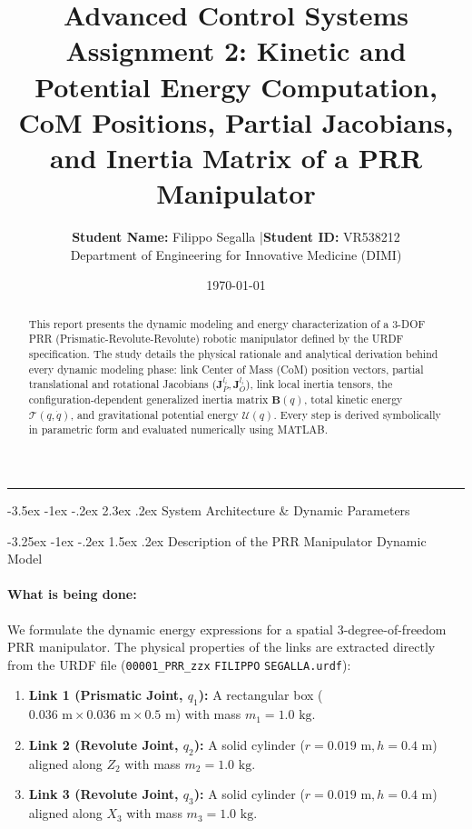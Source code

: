 \documentclass[11pt, a4paper]{article}
\title{
    \vspace{-1cm}
    \color{brandblue}\textbf{Advanced Control Systems}\\[0.3em]
    \Large\textbf{Assignment 2: Kinetic and Potential Energy Computation, CoM Positions, Partial Jacobians, and Inertia Matrix of a PRR Manipulator}
}
\author{\textbf{Student Name:} Filippo Segalla \quad|\quad \textbf{Student ID:} VR538212\\[0.2em]
\small Department of Engineering for Innovative Medicine (DIMI) }
\date{\today}
\makeatletter
\renewcommand{\section}{\@startsection{section}{1}{\z@}%
    {-3.5ex \@plus -1ex \@minus -.2ex}%
    {2.3ex \@plus .2ex}%
    {\normalfont\Large\bfseries\color{brandblue}}}
\renewcommand{\subsection}{\@startsection{subsection}{2}{\z@}%
    {-3.25ex \@plus -1ex \@minus -.2ex}%
    {1.5ex \@plus .2ex}%
    {\normalfont\large\bfseries\color{brandaccent}}}
\makeatother
\begin{document}
\maketitle
\thispagestyle{empty}

\begin{abstract}
\noindent This report presents the dynamic modeling and energy characterization of a 3-DOF PRR (Prismatic-Revolute-Revolute) robotic manipulator defined by the URDF specification. The study details the physical rationale and analytical derivation behind every dynamic modeling phase: link Center of Mass (CoM) position vectors, partial translational and rotational Jacobians ($\mathbf{J}_P^{l_i}, \mathbf{J}_O^{l_i}$), link local inertia tensors, the configuration-dependent generalized inertia matrix $\mathbf{B}(q)$, total kinetic energy $\mathcal{T}(q, \dot{q})$, and gravitational potential energy $\mathcal{U}(q)$. Every step is derived symbolically in parametric form and evaluated numerically using MATLAB.
\end{abstract}

\hrule
\vspace{1.5em}

\section{System Architecture \& Dynamic Parameters}

\subsection{Description of the PRR Manipulator Dynamic Model}
\paragraph{What is being done:}
We formulate the dynamic energy expressions for a spatial 3-degree-of-freedom PRR manipulator. The physical properties of the links are extracted directly from the URDF file (\texttt{00001\_PRR\_zzx} \texttt{FILIPPO} \texttt{SEGALLA.urdf}):
\begin{enumerate}[leftmargin=1.5em]
    \item \textbf{Link 1 (Prismatic Joint, $q_1$):} A rectangular box ($0.036\text{ m} \times 0.036\text{ m} \times 0.5\text{ m}$) with mass $m_1 = 1.0\text{ kg}$.
    \item \textbf{Link 2 (Revolute Joint, $q_2$):} A solid cylinder ($r = 0.019\text{ m}, h = 0.4\text{ m}$) aligned along $Z_2$ with mass $m_2 = 1.0\text{ kg}$.
    \item \textbf{Link 3 (Revolute Joint, $q_3$):} A solid cylinder ($r = 0.019\text{ m}, h = 0.4\text{ m}$) aligned along $X_3$ with mass $m_3 = 1.0\text{ kg}$.
\end{enumerate}
\end{document}
